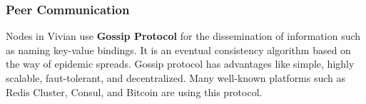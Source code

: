 \subsubsection{Peer Communication}

Nodes in Vivian use \textbf{Gossip Protocol} \cite{10.1145/41840.41841} for the dissemination of information such as naming key-value bindings. It is an eventual consistency algorithm based on the way of epidemic spreads.
Gossip protocol has advantages like simple, highly scalable, faut-tolerant, and decentralized. Many well-known platforms such as Redis Cluster, Consul, and Bitcoin are using this protocol.